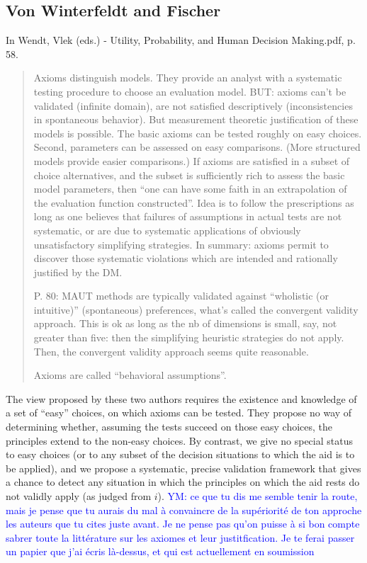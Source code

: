 \documentclass[preprint, french, english, 11pt, authoryear]{elsarticle}%
\newcommand{\commentYM}[1]{\textcolor{blue}{YM: #1}}
\begin{document}
\subsection{Von Winterfeldt and Fischer}
In Wendt, Vlek (eds.) - Utility, Probability, and Human Decision Making.pdf, p. 58.

\begin{quote}
Axioms distinguish models. They provide an analyst with a systematic testing procedure to choose an evaluation model. BUT: axioms can’t be validated (infinite domain), are not satisfied descriptively (inconsistencies in spontaneous behavior). But measurement theoretic justification of these models is possible. The basic axioms can be tested roughly on easy choices. Second, parameters can be assessed on easy comparisons. (More structured models provide easier comparisons.) If axioms are satisfied in a subset of choice alternatives, and the subset is sufficiently rich to assess the basic model parameters, then “one can have some faith in an extrapolation of the evaluation function constructed”. Idea is to follow the prescriptions as long as one believes that failures of assumptions in actual tests are not systematic, or are due to systematic applications of obviously unsatisfactory simplifying strategies. In summary: axioms permit to discover those systematic violations which are intended and rationally justified by the DM. 

P. 80: MAUT methods are typically validated against “wholistic (or intuitive)” (spontaneous) preferences, what’s called the convergent validity approach. This is ok as long as the nb of dimensions is small, say, not greater than five: then the simplifying heuristic strategies do not apply. Then, the convergent validity approach seems quite reasonable.

Axioms are called “behavioral assumptions”.
\end{quote}

The view proposed by these two authors requires the existence and knowledge of a set of “easy” choices, on which axioms can be tested. They propose no way of determining whether, assuming the tests succeed on those easy choices, the principles extend to the non-easy choices. By contrast, we give no special status to easy choices (or to any subset of the decision situations to which the aid is to be applied), and we propose a systematic, precise validation framework that gives a chance to detect any situation in which the principles on which the aid rests do not validly apply (as judged from $i$).
\commentYM{ce que tu dis me semble tenir la route, mais je pense que tu aurais du mal à convaincre de la supériorité de ton approche les auteurs que tu cites juste avant. Je ne pense pas qu'on puisse à si bon compte sabrer toute la littérature sur les axiomes et leur justitfication. Je te ferai passer un papier que j'ai écris là-dessus, et qui est actuellement en soumission}
\end{document}
